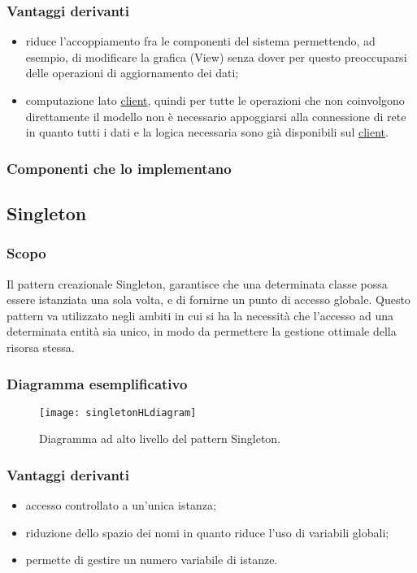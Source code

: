 \subsubsection{Vantaggi derivanti}
\begin{itemize}
\item riduce l'accoppiamento fra le componenti del sistema permettendo, ad esempio, di modificare la grafica (View) senza dover per questo preoccuparsi delle operazioni di aggiornamento dei dati;
\item computazione lato \underline{client}, quindi per tutte le operazioni che non coinvolgono direttamente il modello non è necessario appoggiarsi alla connessione di rete in quanto tutti i dati e la logica necessaria sono già disponibili sul \underline{client}.
\end{itemize}

\subsubsection{Componenti che lo implementano}

\subsection{Singleton}

\subsubsection{Scopo}
Il pattern creazionale Singleton, garantisce che una determinata classe possa essere istanziata una sola volta, e di fornirne un punto di accesso globale. Questo pattern va utilizzato negli ambiti in cui si ha la necessità che l'accesso ad una determinata entità sia unico, in modo da permettere la gestione ottimale della risorsa stessa.

\subsubsection{Diagramma esemplificativo}
\begin{figure}[h]
\centering
\texttt{[image: singletonHLdiagram]}
\caption{Diagramma ad alto livello del pattern Singleton.}\label{fig:singletonHL}
\end{figure}

\subsubsection{Vantaggi derivanti}
\begin{itemize}
\item accesso controllato a un'unica istanza;
\item riduzione dello spazio dei nomi in quanto riduce l'uso di variabili globali;
\item permette di gestire un numero variabile di istanze.
\end{itemize}

